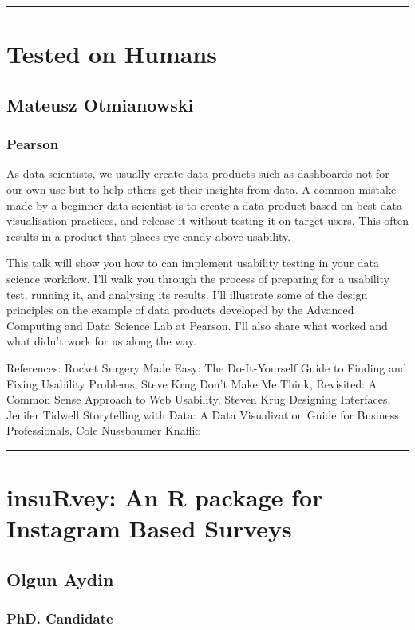 \documentclass [12pt]{article}
\begin{document}
\noindent\rule{\textwidth}{1pt}
\section{Tested on Humans}
\subsection*{Mateusz	Otmianowski}
\subsubsection*{Pearson}

As data scientists, we usually create data products such as dashboards not for our own use but to help others get their insights from data. A common mistake made by a beginner data scientist is to create a data product based on best data visualisation practices, and release it without testing it on target users. This often results in a product that places eye candy above usability.

This talk will show you how to can implement usability testing in your data science workflow. I’ll walk you through the process of preparing for a usability test, running it, and analysing its results. I'll illustrate some of the design principles on the example of data products developed by the Advanced Computing and Data Science Lab at Pearson. I’ll also share what worked and what didn’t work for us along the way.

References: \newline
[] Rocket Surgery Made Easy: The Do-It-Yourself Guide to Finding and Fixing Usability Problems, Steve Krug \newline
[] Don’t Make Me Think, Revisited: A Common Sense Approach to Web Usability, Steven Krug \newline
[] Designing Interfaces, Jenifer Tidwell \newline
[] Storytelling with Data: A Data Visualization Guide for Business Professionals, Cole Nussbaumer Knaflic

\noindent\rule{\textwidth}{1pt}
\section{insuRvey: An R package for Instagram Based Surveys}
\subsection*{Olgun	Aydin}
\subsubsection*{PhD. Candidate}
\end{document}
